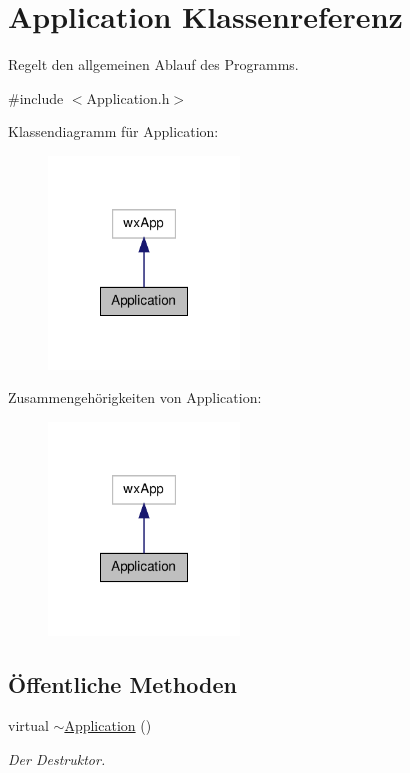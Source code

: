 \hypertarget{classApplication}{\section{Application Klassenreferenz}
\label{classApplication}
}


Regelt den allgemeinen Ablauf des Programms.  




{\ttfamily \#include $<$Application.\-h$>$}



Klassendiagramm für Application\-:\nopagebreak
\begin{figure}[H]
\begin{center}
\leavevmode
\includegraphics[width=144pt]{classApplication__inherit__graph}
\end{center}
\end{figure}


Zusammengehörigkeiten von Application\-:\nopagebreak
\begin{figure}[H]
\begin{center}
\leavevmode
\includegraphics[width=144pt]{classApplication__coll__graph}
\end{center}
\end{figure}
\subsection*{Öffentliche Methoden}
\begin{DoxyCompactItemize}
\item 
virtual \hyperlink{classApplication_a748bca84fefb9c12661cfaa2f623748d}{$\sim$\-Application} ()
\begin{DoxyCompactList}\small\item\em Der Destruktor. \end{DoxyCompactList}\end{DoxyCompactItemize}
